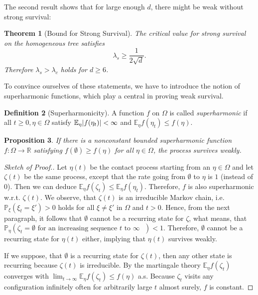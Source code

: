 \documentclass[a4paper,11pt]{amsart}
\theoremstyle{theorem}
\newtheorem{theorem}{Theorem}[section]
\newtheorem{proposition}[theorem]{Proposition}
\theoremstyle{definition}
\newtheorem{definition}[theorem]{Definition}
\newcommand{\R}{\mathbb{R}}
\newcommand{\E}{\mathbb{E}}
\renewcommand{\P}{\mathbb{P}}
\DeclarePairedDelimiter\abs{\lvert}{\rvert}%
\begin{document}
The second result shows that for large enough $d$, there might be weak without strong survival:
\begin{theorem}[Bound for Strong Survival]\label{thm:strong-survival}
	The critical value for strong survival on the homogeneous tree satisfies $$\lambda_s \geq \frac{1}{2\sqrt{d}}.$$
	Therefore $\lambda_s > \lambda_c$ holds for $d\geq 6$.
\end{theorem}

To convince ourselves of these statements, we have to introduce the notion of superharmonic functions, which play a central in proving weak survival.

\begin{definition}[Superharmonicity]
	A function $f$ on $\Omega$ is called \emph{superharmonic} if all $t\geq0, \eta\in\Omega$ satisfy $\E_\eta\abs{f(\eta_t)} < \infty$ and $\E_\eta f(\eta_t) \leq f(\eta)$.
\end{definition}

\begin{proposition}\label{prop:weak-survival}
	If there is a nonconstant bounded superharmonic function $f:\Omega\to \R$ satisfying $f(\emptyset)\geq f(\eta)$ for all $\eta\in\Omega$, the process survives weakly.
\end{proposition}

\begin{proof}[Sketch of Proof.]
	Let $\eta(t)$ be the contact process starting from an $\eta\in\Omega$ and let $\zeta(t)$ be the same process, except that the rate going from $\emptyset$ to $\eta$ is $1$ (instead of $0$).
	Then we can deduce $\E_\eta f(\zeta_t) \leq \E_\eta f(\eta_t)$.
	Therefore, $f$ is also superharmonic w.r.t. $\zeta(t)$.
	We observe, that $\zeta(t)$ is an irreducible Markov chain, i.e. $\P_\xi(\xi_t = \xi') > 0$ holds for all $\xi\neq\xi'$ in $\Omega$ and $t > 0$.
	Hence, from the next paragraph, it follows that $\emptyset$ cannot be a recurring state for $\zeta$, what means, that $\P_\eta( \zeta_t = \emptyset \text{ for an increasing sequence $t$ to $\infty$ }) < 1$.
	Therefore, $\emptyset$ cannot be a recurring state for $\eta(t)$ either, implying that $\eta(t)$ survives weakly.
	
	If we suppose, that $\emptyset$ is a recurring state for $\zeta(t)$, then any other state is recurring because $\zeta(t)$ is irreducible.
	By the martingale theory $\E_\eta f(\zeta_t)$ converges with $\lim_{t\to\infty} \E_\eta f(\zeta_t) \leq f(\eta)$ a.s. 
	Because $\zeta_t$ visits any configuration infinitely often for arbitrarily large $t$ almost surely, $f$ is constant.
\end{proof}
\end{document}
